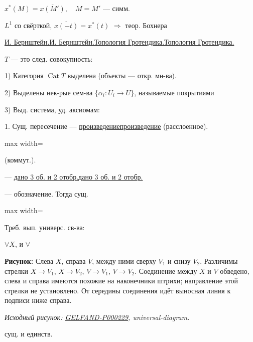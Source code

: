 \documentclass[11pt]{article}
\theoremstyle{definition}
\theoremstyle{remark}
\newcommand{\Unclear}[3]{%
  \begingroup\color{orange!70!black}%
  [Unresolved reading #1/#2: #3]\endgroup%
}
\newcommand{\SourceFigure}[3]{%
  \par\begingroup\color{blue!60!black}\textbf{\hyperref[#1:source-page]{Source figure #1/#2}:} #3%
  \par\textit{Consult the authoritative scan at this locator.}\endgroup\par%
}
\renewcommand{\Unclear}[3]{%
  \begingroup\color{orange!65!black}%
  \ifmmode\text{[неясно: #3]}\else[неясно: #3]\fi\endgroup%
}
\renewcommand{\SourceFigure}[3]{%
  \par\begingroup\color{blue!55!black}\textbf{Рисунок:} #3%
  \par{\small\textit{Исходный рисунок: \hyperref[#1:source-page]{#1}, #2.}}%
  \endgroup\par%
}
\let\DiplomaticMathUnderline\underline
\renewcommand{\underline}[1]{\ifmmode\DiplomaticMathUnderline{#1}\else\uline{#1}\fi}
\begin{document}
$x^*(M)=\overline{x(M')},\quad M=M'$ — симм.

$L^1$ со свёрткой, $\overline{x(-t)}=x^*(t)$
$\Rightarrow$ теор. Бохнера
\Unclear{GELFAND-P000229}{bochner-integral}{$\int_{-\infty}^{+\infty}e^{it\lambda}\,d\sigma(t)$}

\underline{И. Бернштейн.}\quad \underline{Топология Гротендика.}

$T$ — это след. совокупность:

1) Категория $\operatorname{Cat}T$ выделена (объекты — откр. мн-ва).

2) Выделены нек-рые сем-ва $\{\alpha_i:U_i\to U\}$,
называемые покрытиями

3) Выд. система, уд. аксиомам:

1. Сущ. пересечение — \underline{произведение} (расслоенное).

\begin{adjustbox}{max width=\linewidth}
\end{adjustbox}
(коммут.).

— \underline{дано 3 об. и 2 отобр.}

 — обозначение.
Тогда сущ.

\begin{adjustbox}{max width=\linewidth}
\end{adjustbox}

Треб. вып. универс. св-ва:

$\forall X$, и $\forall$
\SourceFigure{GELFAND-P000229}{universal-diagram}{Слева $X$, справа $V$, между ними сверху $V_1$ и снизу $V_2$. Различимы стрелки $X\to V_1$, $X\to V_2$, $V\to V_1$, $V\to V_2$. Соединение между $X$ и $V$ обведено, слева и справа имеются похожие на наконечники штрихи; направление этой стрелки не установлено. От середины соединения идёт выносная линия к подписи ниже справа.}
сущ. и единств.
\end{document}

